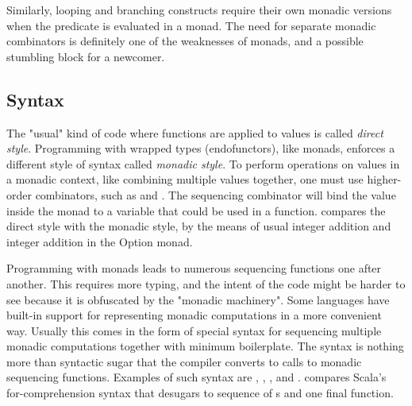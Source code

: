

Similarly, looping and branching constructs require their own monadic versions when the predicate is evaluated in a monad. The need for separate monadic combinators is definitely one of the weaknesses of monads, and a possible stumbling block for a newcomer.


\subsection{Syntax} \label{background:monad:syntax}
The "usual" kind of code where functions are applied to values is called \textit{direct style}. Programming with wrapped types (endofunctors), like monads, enforces a different style of syntax called \textit{monadic style}. To perform operations on values in a monadic context, like combining multiple values together, one must use higher-order combinators, such as  and . The sequencing combinator will bind the value inside the monad to a variable that could be used in a function.  compares the direct style with the monadic style, by the means of usual integer addition and integer addition in the Option monad.



Programming with monads leads to numerous sequencing functions one after another. This requires more typing, and the intent of the code might be harder to see because it is obfuscated by the "monadic machinery". Some languages have built-in support for representing monadic computations in a more convenient way. Usually this comes in the form of special syntax for sequencing multiple monadic computations together with minimum boilerplate. The syntax is nothing more than syntactic sugar that the compiler converts to calls to monadic sequencing functions. Examples of such syntax are \textcite{haskell-do-notation}, \textcite{scala-for-comprehension}, \textcite{fsharp-computation-expression}, and \textcite{ocaml-bind-ops}.  compares Scala's for-comprehension syntax that desugars to sequence of s and one final  function.



